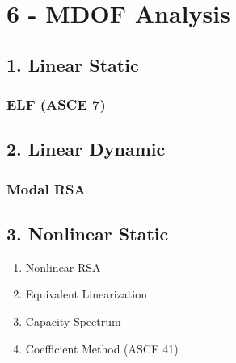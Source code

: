 \hypertarget{mdof-analysis}{%
\section{6 - MDOF Analysis}\label{mdof-analysis}}

\hypertarget{linear-static}{%
\subsection{1. Linear Static}\label{linear-static}}

\hypertarget{elf-asce-7}{%
\subsubsection{ELF (ASCE 7)}\label{elf-asce-7}}

\hypertarget{linear-dynamic}{%
\subsection{2. Linear Dynamic}\label{linear-dynamic}}

\hypertarget{modal-rsa}{%
\subsubsection{Modal RSA}\label{modal-rsa}}

\hypertarget{nonlinear-static}{%
\subsection{3. Nonlinear Static}\label{nonlinear-static}}

\begin{enumerate}
\def\labelenumi{\arabic{enumi}.}
\tightlist
\item
  Nonlinear RSA
\item
  Equivalent Linearization
\item
  Capacity Spectrum
\item
  Coefficient Method (ASCE 41)
\end{enumerate}

